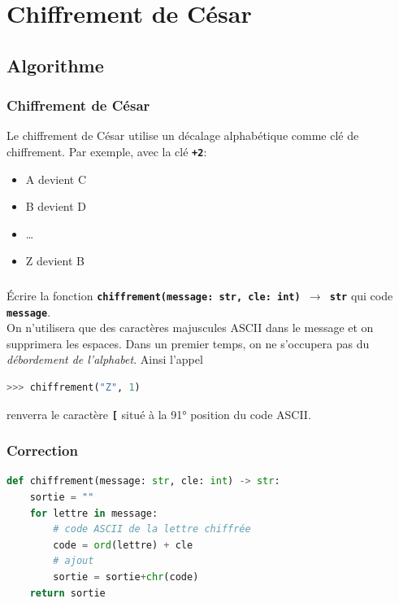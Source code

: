 \documentclass[svgnames,11pt]{beamer}
\begin{document}
\section{Chiffrement de César}
\subsection{Algorithme}
\begin{frame}
    \frametitle{Chiffrement de César}

    Le chiffrement de César utilise un décalage alphabétique comme clé de chiffrement. Par exemple, avec la clé \textbf{\texttt{+2}}:
    \begin{itemize}
        \item A devient C
        \item B devient D
        \item \dots
        \item Z devient B
    \end{itemize}

\end{frame}
\begin{frame}[fragile]
    \frametitle{}
    
    \begin{activite}
        Écrire la fonction \textbf{\texttt{chiffrement(message: str, cle: int) $\rightarrow$ str}} qui code \textbf{\texttt{message}}. \\
        On n'utilisera que des caractères majuscules ASCII dans le message et on supprimera les espaces.     Dans un premier temps, on ne s'occupera pas du \emph{débordement de l'alphabet}. Ainsi l'appel
\begin{center}
\begin{lstlisting}[language=Python , basicstyle=\ttfamily\small, xleftmargin=2em, xrightmargin=2em]
>>> chiffrement("Z", 1)
\end{lstlisting}
\end{center}
renverra le caractère \textbf{\texttt{[}} situé à la 91° position du code ASCII.
    \end{activite}

\end{frame}
\begin{frame}[fragile]
    \frametitle{Correction}

\begin{center}
\begin{lstlisting}[language=Python , basicstyle=\ttfamily\small, xleftmargin=0.2em, xrightmargin=0em]
def chiffrement(message: str, cle: int) -> str:
    sortie = ""
    for lettre in message:
        # code ASCII de la lettre chiffrée
        code = ord(lettre) + cle
        # ajout
        sortie = sortie+chr(code)
    return sortie
\end{lstlisting}
\end{center}

\end{frame}
\end{document}
